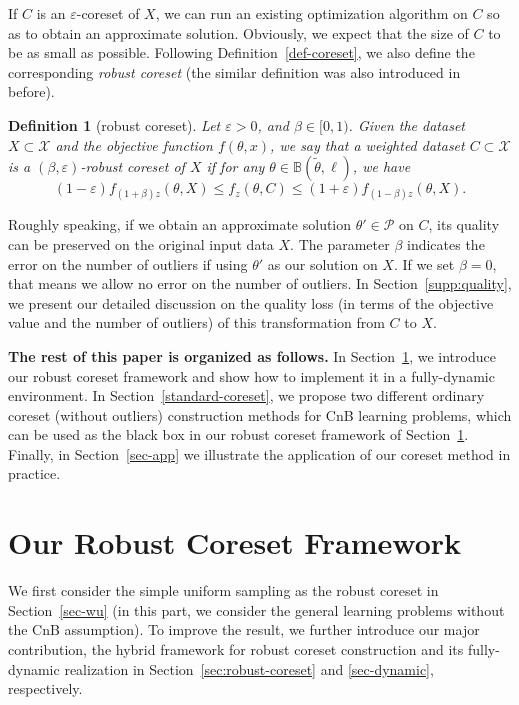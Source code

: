 \documentclass{article}
\newtheorem{definition}{Definition}
\begin{document}
If $C$ is an  $ \varepsilon $-coreset of $ X $, we can run an existing optimization algorithm on $C$ so as to obtain an approximate solution. Obviously, we expect that the size of $C$ to be as small as possible. Following Definition~\ref{def-coreset}, we  also define the corresponding \emph{robust coreset} (the similar definition was also introduced in~\cite{FeldmanL11,HuangJLW18} before).

\begin{definition}[robust coreset]\label{robust-coreset}
	Let $\varepsilon>0$, and $\beta\in [0,1)$. Given the dataset $ X\subset \mathcal{X} $ and the objective function $ {f}(\theta,x) $, we say that a weighted dataset $ C\subset \mathcal{X} $ is a $ (\beta,\varepsilon) $-robust coreset of $ X $ if for any $ \theta\in \mathbb{B}(\tilde{\theta}, \ell) $, we have
	\begin{equation}
		(1-\varepsilon) f_{(1+\beta)z}(\theta,X)  \leq
		 {f}_{z}(\theta,C)  \leq (1+\varepsilon) f_{(1-\beta)z}(\theta,X).
	\end{equation}

\end{definition}
Roughly speaking, if we obtain an approximate solution $\theta'\in\mathcal{P}$ on $C$, its quality can be preserved on the original input data $X$. The parameter $\beta$ indicates the error on the number of outliers if using $\theta'$ as our solution on $X$. If we set $\beta=0$, that means we allow no error on the number of outliers.  In Section~\ref{supp:quality}, we present our detailed discussion on the quality loss (in terms of the objective value and the number of outliers) of this transformation from $C$ to $X$.

\textbf{The rest of this paper is organized as follows.} In Section~\ref{robust}, we introduce our robust coreset framework and show how to implement it in a fully-dynamic environment. In Section~\ref{standard-coreset}, we propose two different ordinary coreset (without outliers) construction methods for CnB learning problems, which can be used as the black box in our robust coreset framework of Section~\ref{robust}. Finally, in Section~\ref{sec-app} we illustrate the application of our coreset method in practice.

\section{Our Robust Coreset Framework}
\label{robust}   
We first consider the simple uniform sampling as the robust coreset in Section~\ref{sec-wu} (in this part, we consider the general learning problems without the CnB assumption). To improve the result, we further introduce our major contribution, the hybrid framework for robust coreset construction and its fully-dynamic realization in Section~\ref{sec:robust-coreset} and \ref{sec-dynamic}, respectively. 
\end{document}
